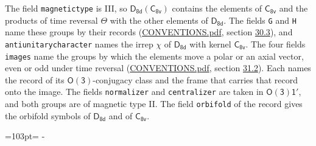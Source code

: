 \documentclass[10pt,a4paper]{article}
\newcommand{\needspace}[1]{\par\penalty-100\begingroup\dimen0=#1\relax\dimen2=\pagegoal
  \advance\dimen2-\pagetotal\ifdim\dimen0>\dimen2\relax\ifdim\dimen2>0pt\vfil\break\fi\fi
  \endgroup}
\numberwithin{equation}{section}
\newcommand{\grp}[1]{\mathsf{#1}}
\begin{document}
The field \texttt{magnetictype} is III, so $\grp{D_{8d}}(\grp{C_{8v}})$ contains the elements of $\grp{C_{8v}}$ and the products of time reversal $\varTheta$ with the other elements of $\grp{D_{8d}}$. The fields \texttt{G} and \texttt{H} name these groups by their records (\href{../../CONVENTIONS.pdf}{CONVENTIONS.pdf}, section \href{../../CONVENTIONS.pdf\#conv.30.3}{30.3}), and \texttt{antiunitarycharacter} names the irrep $\chi$ of $\grp{D_{8d}}$ with kernel $\grp{C_{8v}}$. The four fields \texttt{images} name the groups by which the elements move a polar or an axial vector, even or odd under time reversal (\href{../../CONVENTIONS.pdf}{CONVENTIONS.pdf}, section \href{../../CONVENTIONS.pdf\#conv.31.2}{31.2}). Each names the record of its $\grp{O(3)}$-conjugacy class and the frame that carries that record onto the image. The fields \texttt{normalizer} and \texttt{centralizer} are taken in $\grp{O(3)1'}$, and both groups are of magnetic type II. The field \texttt{orbifold} of the record gives the orbifold symbols of $\grp{D_{8d}}$ and of $\grp{C_{8v}}$.
\needspace{103pt}
\end{document}
